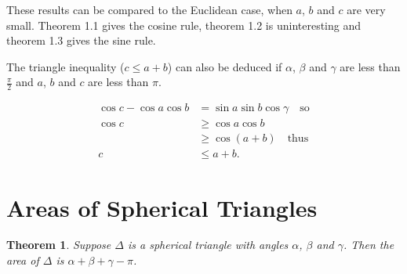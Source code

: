 \documentclass{notes}
\theoremstyle{plain}
\newtheorem{theorem}[proposition]{Theorem}
\begin{document}
These results can be compared to the Euclidean case, when $a$, $b$ and $c$ are
very small.  Theorem 1.1 gives the cosine rule, theorem 1.2 is uninteresting
and theorem 1.3 gives the sine rule.

The triangle inequality ($c \le a + b$) can also be deduced if $\alpha$,
$\beta$ and $\gamma$ are less than $\frac{\pi}{2}$ and $a$, $b$ and $c$ are
less than $\pi$.

\begin{align*}
\cos c - \cos a \cos b &= \sin a \sin b \cos \gamma \quad \text{so} \\
\cos c & \ge \cos a \cos b \\
& \ge \cos (a+b) \quad \text{thus} \\
c & \le a + b.
\end{align*}

\section{Areas of Spherical Triangles}

\begin{theorem}
Suppose $\Delta$ is a spherical triangle with angles $\alpha$, $\beta$ and
$\gamma$.  Then the area of $\Delta$ is $\alpha + \beta + \gamma - \pi$.
\end{theorem}
\end{document}
